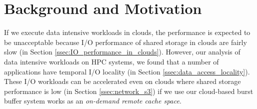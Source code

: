 \section{Background and Motivation}
\label{sec:background}
If we execute data intensive workloads in clouds, the performance is
expected to be unacceptable because I/O performance of shared storage in clouds
are fairly slow (in Section \ref{ssec:IO_performance_in_clouds}). 
However, our analysis of data intensive workloads on HPC systems, we found
that a number of applications have temporal I/O locality (in Section
\ref{ssec:data_access_locality}). These I/O workloads can be accelerated even on
clouds where shared storage performance is low (in Section
\ref{ssec:network_s3}) if we use our cloud-based burst buffer system works as an
\emph{on-demand remote cache space}. 


